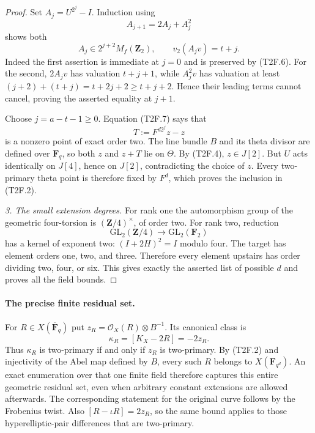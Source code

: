 \documentclass[11pt,a4paper]{article}
\begin{document}
\begin{proof}
Set $A_j=U^{2^j}-I$. Induction using
\[
                         A_{j+1}=2A_j+A_j^2
 \tag{T2F.6}
\]
shows both
\[
 A_j\in2^{j+2}M_f(\mathbf Z_2),\qquad
                         v_2(A_jv)=t+j.
 \tag{T2F.7}
\]
Indeed the first assertion is immediate at $j=0$ and is preserved
by (T2F.6). For the second, $2A_jv$ has valuation $t+j+1$, while
$A_j^2v$ has valuation at least
$(j+2)+(t+j)=t+2j+2\ge t+j+2$. Hence their leading terms
cannot cancel, proving the asserted equality at $j+1$.

Choose $j=a-t-1\ge0$. Equation (T2F.7) says that
\[
                    T:=F^{d2^j}z-z
 \tag{T2F.8}
\]
is a nonzero point of exact order two. The line bundle $B$ and
its theta divisor are defined over $\mathbf F_q$, so both $z$
and $z+T$ lie on $\Theta$. By (T2F.4), $z\in J[2]$. But $U$
acts identically on $J[4]$, hence on $J[2]$, contradicting the
choice of $z$. Every two-primary theta point is therefore fixed
by $F^d$, which proves the inclusion in (T2F.2).

\emph{3. The small extension degrees.}
For rank one the automorphism group of the geometric four-torsion
is $(\mathbf Z/4)^\times$, of order two. For rank two, reduction
\[
                  \mathrm{GL}_2(\mathbf Z/4)
                          \longrightarrow\mathrm{GL}_2(\mathbf F_2)
\]
has a kernel of exponent two: $(I+2H)^2=I$ modulo four.
The target has element orders one, two, and three. Therefore
every element upstairs has order dividing two, four, or six.
This gives exactly the asserted list of possible $d$ and proves
all the field bounds.
\end{proof}

\paragraph{The precise finite residual set.}
For $R\in X(\overline{\mathbf F}_q)$ put
$z_R=\mathcal O_X(R)\otimes B^{-1}$. Its canonical class is
\[
                    \kappa_R=[K_X-2R]=-2z_R.
 \tag{T2F.9}
\]
Thus $\kappa_R$ is two-primary if and only if $z_R$ is
two-primary. By (T2F.2) and injectivity of the Abel map defined
by $B$, every such $R$ belongs to $X(\mathbf F_{q^d})$.
An exact enumeration over that one finite field therefore
captures this entire geometric residual set, even when arbitrary
constant extensions are allowed afterwards. The corresponding
statement for the original curve follows by the Frobenius twist.
Also $[R-\iota R]=2z_R$, so the same bound applies to those
hyperelliptic-pair differences that are two-primary.
\end{document}
